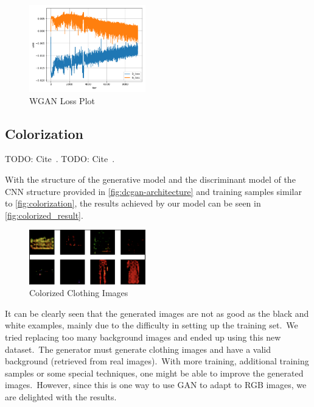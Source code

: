 \documentclass[conference]{IEEEtran}
\begin{document}
    \begin{figure}
        \caption{WGAN Loss Plot}
        \label{fig:loss-plot-wgan}
        \includegraphics[width=0.45\textwidth]{WGAN_loss.png}
        \centering
    \end{figure}

    \subsection{Colorization}\label{subsec:results-colorization}

    TODO: Cite~\cite{e-in-style}.
    TODO: Cite~\cite{pytorch-generative-model-collections}.

    With the structure of the generative model and the discriminant model of the CNN structure provided in \autoref{fig:dcgan-architecture} and training samples similar to \autoref{fig:colorization}, the results achieved by our model can be seen in \autoref{fig:colorized_result}.

    \begin{figure}
        \caption{Colorized Clothing Images}
        \label{fig:colorized_result}
        \includegraphics[width=0.45\textwidth]{learned_result.png}
        \centering
    \end{figure}

    It can be clearly seen that the generated images are not as good as the black and white examples, mainly due to the difficulty in setting up the training set.\ We tried replacing too many background images and ended up using this new dataset.\ The generator must generate clothing images and have a valid background (retrieved from real images).\ With more training, additional training samples or some special techniques, one might be able to improve the generated images.\ However, since this is one way to use GAN to adapt to RGB images, we are delighted with the results.
\end{document}
